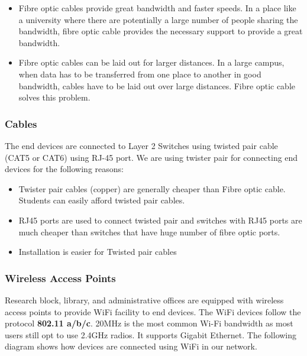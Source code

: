\documentclass{article}
\begin{document}
\begin{itemize}
	\item Fibre optic cables provide great bandwidth and faster speeds. In a place like a university where there are potentially a large number of people sharing the bandwidth, fibre optic cable provides the necessary support to provide a great bandwidth.
	\item Fibre optic cables can be laid out for larger distances. In a large campus, when data has to be transferred from one place to another in good bandwidth, cables have to be laid out over large distances. Fibre optic cable solves this problem.
\end{itemize}

\subsubsection{Cables}
The end devices are connected to Layer 2 Switches using twisted pair cable (CAT5 or CAT6) using RJ-45 port. We are using twister pair for connecting end devices for the following reasons:
\begin{itemize}
	\item Twister pair cables (copper) are generally cheaper than Fibre optic cable. Students can easily afford twisted pair cables.
	\item RJ45 ports are used to connect twisted pair and switches with RJ45 ports are much cheaper than switches that have huge number of fibre optic ports.
	\item Installation is easier for Twisted pair cables
\end{itemize}

\subsubsection{Wireless Access Points}
Research block, library, and administrative offices are equipped with wireless access points to provide WiFi facility to end devices. The WiFi devices follow the protocol \textbf{802.11 a/b/c}. 20MHz is the most common Wi-Fi bandwidth as most users still opt to use 2.4GHz radios. It supports Gigabit Ethernet. The following diagram shows how devices are connected using WiFi in our network.
\end{document}
